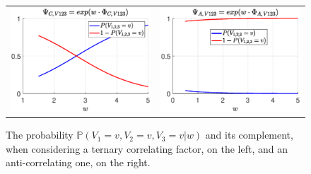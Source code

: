 \begin{figure}
\begin{tabular}{cc}
\begin{minipage}[t]{0.48 \columnwidth}
\includegraphics[width=\columnwidth]{../Chapter_additional/03_Samples/image_01/Ternary_corr.eps}
\end{minipage} 
 & 
\begin{minipage}[t]{0.48 \columnwidth}
\includegraphics[width=\columnwidth]{../Chapter_additional/03_Samples/image_01/Ternary_anitcorr.eps}
\end{minipage} 
\end{tabular}
\caption{The probability $\mathbb{P}( V_1 = v,  V_2 = v, V_3 = v | w)$ and its complement, when considering a ternary correlating factor, on the left, and an anti-correlating one, on the right.}
\label{fig:sample_01:0}
\end{figure}

